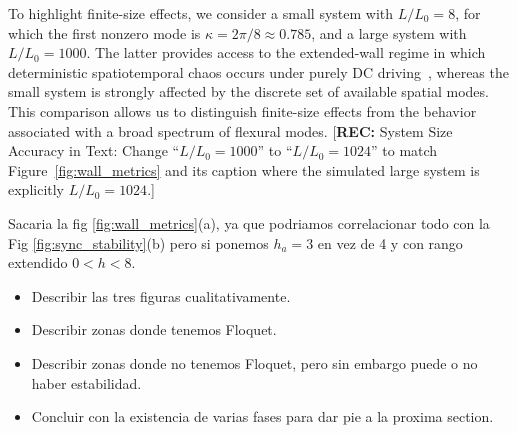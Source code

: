 \documentclass[prb,aps,twocolumn,superscriptaddress,floatfix]{revtex4-1}
\newcommand{\aleadd}[1]{{\color{blue}#1}}
\newcommand{\alecom}[1]{{\color{red}#1}}
\newcommand{\rec}[1]{{\color{magenta}[\textbf{REC:} #1]}}
\begin{document}
\aleadd{
To highlight finite-size effects, we consider a small system with $L/L_0=8$, for which the first nonzero mode is $\kappa=2\pi/8\approx 0.785$, and a large system with $L/L_0=1000$. The latter provides access to the extended-wall regime in which deterministic spatiotemporal chaos occurs under purely DC driving~\cite{pusiol2026deterministic}, whereas the small system is strongly affected by the discrete set of available spatial modes. This comparison allows us to distinguish finite-size effects from the behavior associated with a broad spectrum of flexural modes.
\rec{System Size Accuracy in Text: Change ``$L/L_0=1000$'' to ``$L/L_0=1024$'' to match Figure~\ref{fig:wall_metrics} and its caption where the simulated large system is explicitly $L/L_0=1024$.}

\alecom{
Sacaria la fig \ref{fig:wall_metrics}(a), ya que podriamos correlacionar todo con la Fig \ref{fig:sync_stability}(b) pero si ponemos $h_a=3$ en vez de 4 y con rango extendido $0<h<8$.}


\alecom{
\begin{itemize}
    \item Describir las tres figuras cualitativamente.
    \item Describir zonas donde tenemos Floquet.
    \item Describir zonas donde no tenemos Floquet, pero sin embargo puede o no haber estabilidad.
    \item Concluir con la existencia de varias fases para dar pie a la proxima section.
\end{itemize}
}

}
\end{document}
